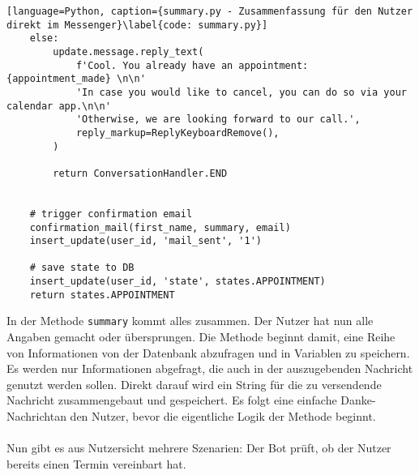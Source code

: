 \begin{lstlisting}[language=Python, caption={summary.py - Zusammenfassung für den Nutzer direkt im Messenger}\label{code: summary.py}]
    else:
        update.message.reply_text(
            f'Cool. You already have an appointment: {appointment_made} \n\n'
            'In case you would like to cancel, you can do so via your calendar app.\n\n'
            'Otherwise, we are looking forward to our call.',
            reply_markup=ReplyKeyboardRemove(),
        )

        return ConversationHandler.END


    # trigger confirmation email
    confirmation_mail(first_name, summary, email)
    insert_update(user_id, 'mail_sent', '1')

    # save state to DB
    insert_update(user_id, 'state', states.APPOINTMENT)
    return states.APPOINTMENT
            \end{lstlisting}

                In der Methode \verb|summary| kommt alles zusammen. Der Nutzer hat nun alle Angaben gemacht oder übersprungen. Die Methode beginnt damit, eine Reihe von Informationen von der Datenbank abzufragen und in Variablen zu speichern. Es werden nur Informationen abgefragt, die auch in der auszugebenden Nachricht genutzt werden sollen. Direkt darauf wird ein String für die zu versendende Nachricht zusammengebaut und gespeichert. Es folgt eine einfache \glqq Danke-Nachricht\grqq an den Nutzer, bevor die eigentliche Logik der Methode beginnt.\\
                \\
                Nun gibt es aus Nutzersicht mehrere Szenarien: Der Bot prüft, ob der Nutzer bereits einen Termin vereinbart hat.
                
